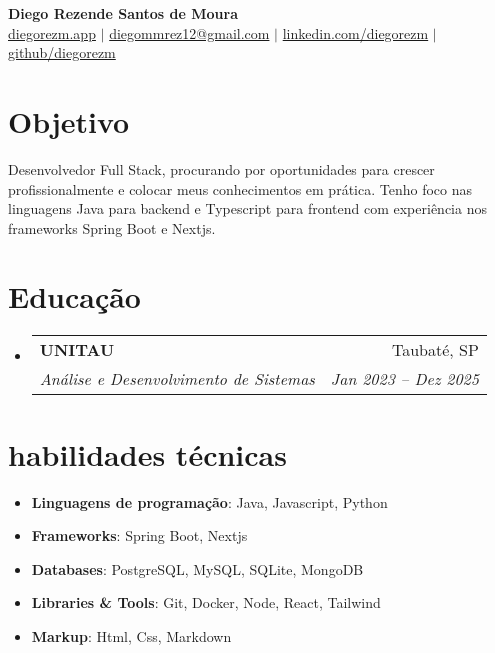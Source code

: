 \documentclass[letterpaper,10pt]{article}
\makeatletter
\newcommand{\resumeItem}[1]{\item\small{#1}}
\newcommand{\resumeSubheading}[4]{
\vspace{-1pt}\item
  \begin{tabular*}{0.97\textwidth}[t]{l@{\extracolsep{\fill}}r}
    \textbf{#1} & #2 \\
    \textit{#3} & \textit{#4} \\
  \end{tabular*}\vspace{-7pt}
}
\newcommand{\resumeSubHeadingList}{\begin{itemize}[leftmargin=0.15in, label={}]}
\newcommand{\resumeSubHeadingListEnd}{\end{itemize}}
\makeatother
\begin{document}
\begin{center}
  \textbf{\Huge Diego Rezende Santos de Moura} \\
  \small \href{https://diegorezm.netlify.app/}{diegorezm.app} $|$ \href{mailto:diegommrez12@gmail.com}{diegommrez12@gmail.com} $|$ 
  \href{https://linkedin.com/in/diegorezm}{linkedin.com/diegorezm} $|$
  \href{https://github.com/diegorezm}{github/diegorezm}
\end{center}

\section*{Objetivo}
Desenvolvedor Full Stack, procurando por oportunidades para crescer profissionalmente e colocar meus conhecimentos em prática. Tenho foco nas linguagens Java para backend e Typescript para frontend com experiência nos frameworks Spring Boot e Nextjs.

\section{Educação}
\resumeSubHeadingList
  \resumeSubheading
      {UNITAU}{Taubaté, SP}
      {Análise e Desenvolvimento de Sistemas} {Jan 2023 -- Dez 2025}
\resumeSubHeadingListEnd

\section{habilidades técnicas}
\resumeSubHeadingList
  \resumeItem{\textbf{Linguagens de programação}: Java, Javascript, Python}
  \resumeItem{\textbf{Frameworks}: Spring Boot, Nextjs}
  \resumeItem{\textbf{Databases}: PostgreSQL, MySQL, SQLite, MongoDB}
  \resumeItem{\textbf{Libraries \& Tools}: Git, Docker, Node, React, Tailwind}
   \resumeItem{\textbf{Markup}: Html, Css, Markdown}
\resumeSubHeadingListEnd
\end{document}
